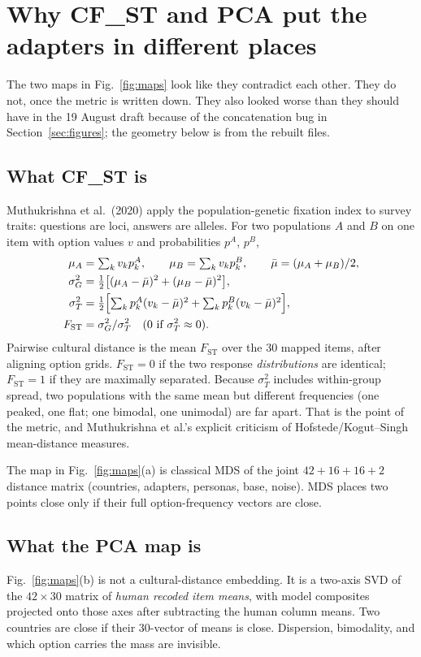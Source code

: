 \documentclass[11pt]{article}
\begin{document}
\section{Why CF\_ST and PCA put the adapters in different places}
\label{sec:cfst}

The two maps in Fig.~\ref{fig:maps} look like they contradict each other. They do not, once the metric is written down. They also looked worse than they should have in the 19 August draft because of the concatenation bug in Section~\ref{sec:figures}; the geometry below is from the rebuilt files.

\subsection{What CF\_ST is}
Muthukrishna et al.\ (2020) apply the population-genetic fixation index to survey traits: questions are loci, answers are alleles. For two populations $A$ and $B$ on one item with option values $v$ and probabilities $p^A$, $p^B$,
\begin{align}
\mu_A &= \textstyle\sum_k v_k p^A_k,\qquad
\mu_B = \textstyle\sum_k v_k p^B_k,\qquad
\bar\mu = (\mu_A+\mu_B)/2, \nonumber\\
\sigma^2_G &= \tfrac12\bigl[(\mu_A-\bar\mu)^2+(\mu_B-\bar\mu)^2\bigr], \nonumber\\
\sigma^2_T &= \tfrac12\Bigl[\textstyle\sum_k p^A_k(v_k-\bar\mu)^2 + \textstyle\sum_k p^B_k(v_k-\bar\mu)^2\Bigr], \nonumber\\
F_{\mathrm{ST}} &= \sigma^2_G / \sigma^2_T \quad (\text{0 if }\sigma^2_T\approx 0). \nonumber
\end{align}
Pairwise cultural distance is the mean $F_{\mathrm{ST}}$ over the 30 mapped items, after aligning option grids. $F_{\mathrm{ST}}=0$ if the two response \emph{distributions} are identical; $F_{\mathrm{ST}}=1$ if they are maximally separated. Because $\sigma^2_T$ includes within-group spread, two populations with the same mean but different frequencies (one peaked, one flat; one bimodal, one unimodal) are far apart. That is the point of the metric, and Muthukrishna et al.'s explicit criticism of Hofstede/Kogut--Singh mean-distance measures.

The map in Fig.~\ref{fig:maps}(a) is classical MDS of the joint $42+16+16+2$ distance matrix (countries, adapters, personas, base, noise). MDS places two points close only if their full option-frequency vectors are close.

\subsection{What the PCA map is}
Fig.~\ref{fig:maps}(b) is not a cultural-distance embedding. It is a two-axis SVD of the $42\times 30$ matrix of \emph{human recoded item means}, with model composites projected onto those axes after subtracting the human column means. Two countries are close if their 30-vector of means is close. Dispersion, bimodality, and which option carries the mass are invisible.
\end{document}
